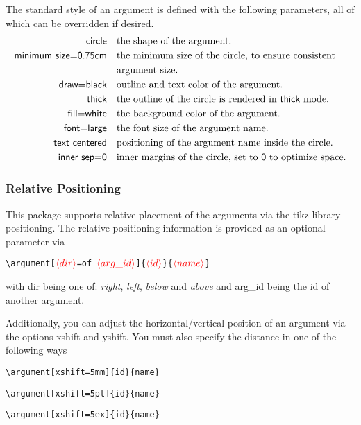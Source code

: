 \documentclass{article}
\newcommand{\opt}[1]{\ensuremath{\textcolor[rgb]{1.00,0.00,0.00}{\langle #1\rangle}}}
\begin{document}
    The \textsf{standard} style of an argument is defined with the following parameters, all of which can be overridden if desired.
    \begin{align*}
        \textsf{circle} &\quad \text{the shape of the argument.}\\
        \textsf{minimum~size=0.75cm} &\quad \text{the minimum size of the circle, to ensure consistent}\\
        &\quad \text{argument size.}\\
        \textsf{draw=black} &\quad \text{outline and text color of the argument.}\\
        \textsf{thick} &\quad \text{the outline of the circle is rendered in \textsf{thick} mode.}\\
        \textsf{fill=white} &\quad \text{the background color of the argument.}\\
        \textsf{font=large} &\quad \text{the font size of the argument name.}\\
        \textsf{text~centered} &\quad \text{positioning of the argument name inside the circle.}\\
        \textsf{inner~sep=0} &\quad \text{inner margins of the circle, set to \textsf{0} to optimize space.}
    \end{align*}
    \subsubsection{Relative Positioning}    
    This package supports relative placement of the arguments via the \textsf{tikz}-library \textsf{positioning}.
    The relative positioning information is provided as an optional parameter via
    
    \verb|\argument[|\opt{dir}\verb|=of |\opt{arg\_id}\verb|]{|\opt{id}\verb|}{|\opt{name}\verb|}|
    
    \noindent
    with \textsf{dir} being one of: \emph{right}, \emph{left}, \emph{below} and \emph{above} and \textsf{arg\_id} being the id of another argument.
    
    Additionally, you can adjust the horizontal/vertical position of an argument via the options \textsf{xshift} and \textsf{yshift}.
    You must also specify the distance in one of the following ways

    \verb|\argument[xshift=5mm]{id}{name}|

    \verb|\argument[xshift=5pt]{id}{name}|

    \verb|\argument[xshift=5ex]{id}{name}|
\end{document}
